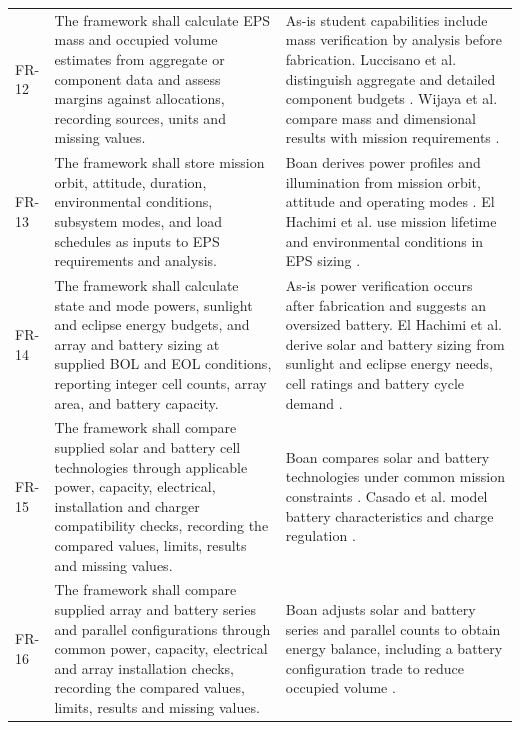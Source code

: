 \begin{longtable}{@{}P{0.13\ReportTableBodyWidth}P{0.45\ReportTableBodyWidth}P{0.42\ReportTableBodyWidth}@{}}
\addlinespace[3pt]
FR-12 & The framework shall calculate EPS mass and occupied volume estimates from aggregate or component data and assess margins against allocations, recording sources, units and missing values. & As-is student capabilities include mass verification by analysis before fabrication. Luccisano et al. distinguish aggregate and detailed component budgets \citep[Secs.~3.1--3.2]{luccisano2024formalization}. Wijaya et al. compare mass and dimensional results with mission requirements \citep[Sec.~5.2]{review-0055}. \\
\addlinespace[3pt]
FR-13 & The framework shall store mission orbit, attitude, duration, environmental conditions, subsystem modes, and load schedules as inputs to EPS requirements and analysis. & Boan derives power profiles and illumination from mission orbit, attitude and operating modes \citep[Sec.~2]{review-0289}. El Hachimi et al. use mission lifetime and environmental conditions in EPS sizing \citep[Secs.~2--3]{handpicked-0003}. \\
\addlinespace[3pt]
FR-14 & The framework shall calculate state and mode powers, sunlight and eclipse energy budgets, and array and battery sizing at supplied BOL and EOL conditions, reporting integer cell counts, array area, and battery capacity. & As-is power verification occurs after fabrication and suggests an oversized battery. El Hachimi et al. derive solar and battery sizing from sunlight and eclipse energy needs, cell ratings and battery cycle demand \citep[Secs.~3 and~6.2]{handpicked-0003}. \\
\addlinespace[3pt]
FR-15 & The framework shall compare supplied solar and battery cell technologies through applicable power, capacity, electrical, installation and charger compatibility checks, recording the compared values, limits, results and missing values. & Boan compares solar and battery technologies under common mission constraints \citep[Secs.~3--4]{review-0289}. Casado et al. model battery characteristics and charge regulation \citep[Secs.~2.2--2.3]{review-0573}. \\
\addlinespace[3pt]
FR-16 & The framework shall compare supplied array and battery series and parallel configurations through common power, capacity, electrical and array installation checks, recording the compared values, limits, results and missing values. & Boan adjusts solar and battery series and parallel counts to obtain energy balance, including a battery configuration trade to reduce occupied volume \citep[Secs.~3--4]{review-0289}. \\

\end{longtable}
